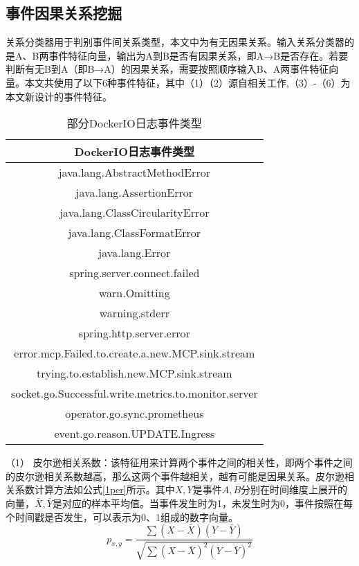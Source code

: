 \subsection{事件因果关系挖掘}
关系分类器用于判别事件间关系类型，本文中为有无因果关系。输入关系分类器的是A、B两事件特征向量，输出为A到B是否有因果关系，即A→B是否存在。若要判断有无B到A（即B→A）的因果关系，需要按照顺序输入B、A两事件特征向量。本文共使用了以下6种事件特征，其中（1）（2）源自相关工作\cite{nie2016mining-causality-graph},（3）-（6）为本文新设计的事件特征。
\newpage
\begin{table}[htbp]
    \centering
    \caption{部分DockerIO日志事件类型}
    \label{dockerio-event}
    \begin{tabular}{c}
    \toprule[1.5pt]
    DockerIO日志事件类型                                       \\ \midrule[1.5pt]
    java.lang.AbstractMethodError                        \\
    java.lang.AssertionError                             \\
    java.lang.ClassCircularityError                      \\
    java.lang.ClassFormatError                           \\
    java.lang.Error                                      \\
    spring.server.connect.failed                         \\
    warn.Omitting                                        \\
    warning.stderr                                       \\
    spring.http.server.error                             \\
    error.mcp.Failed.to.create.a.new.MCP.sink.stream     \\
    trying.to.establish.new.MCP.sink.stream              \\
    socket.go.Successful.write.metrics.to.monitor.server \\
    operator.go.sync.prometheus                          \\
    event.go.reason.UPDATE.Ingress                       \\ \bottomrule[1.5pt]
    \end{tabular}
\end{table}

（1） 皮尔逊相关系数：该特征用来计算两个事件之间的相关性，即两个事件之间的皮尔逊相关系数越高，那么这两个事件越相关，越有可能是因果关系。皮尔逊相关系数计算方法如公式\ref{1per}所示。其中$X,Y$是事件$A,B$分别在时间维度上展开的向量，$\bar{X},\bar{Y}$是对应的样本平均值。当事件发生时为1，未发生时为0，事件按照在每个时间戳是否发生，可以表示为0、1组成的数字向量。
\begin{equation}
    p_{x, y}=\frac{\sum(X-\bar{X})(Y-\bar{Y})}{\sqrt{\sum(X-\bar{X})^{2}(Y-\bar{Y})^{2}}}\label{1per}
\end{equation}

